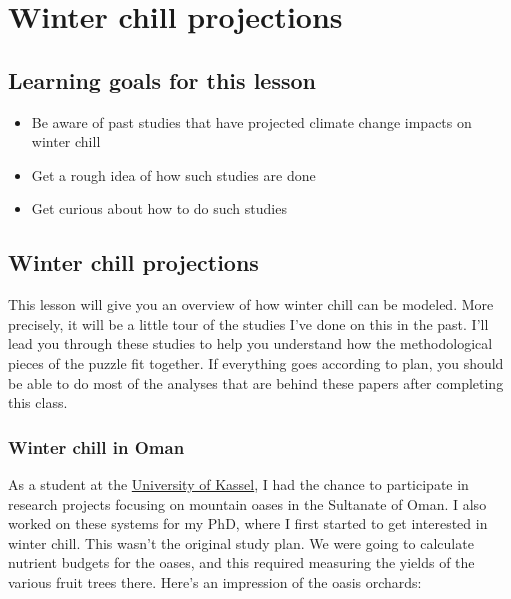 \documentclass[
]{book}
\providecommand{\tightlist}{%
  \setlength{\itemsep}{0pt}\setlength{\parskip}{0pt}}
\begin{document}
\hypertarget{winter-chill-projections}{%
\chapter{Winter chill projections}\label{winter-chill-projections}}

\hypertarget{goals_analysis_examples}{%
\section*{Learning goals for this lesson}\label{goals_analysis_examples}}

\begin{itemize}
\tightlist
\item
  Be aware of past studies that have projected climate change impacts on winter chill
\item
  Get a rough idea of how such studies are done
\item
  Get curious about how to do such studies
\end{itemize}

\hypertarget{winter-chill-projections-1}{%
\section{Winter chill projections}\label{winter-chill-projections-1}}

This lesson will give you an overview of how winter chill can be modeled. More precisely, it will be a little tour of the studies I've done on this in the past. I'll lead you through these studies to help you understand how the methodological pieces of the puzzle fit together. If everything goes according to plan, you should be able to do most of the analyses that are behind these papers after completing this class.

\hypertarget{winter-chill-in-oman}{%
\subsection{Winter chill in Oman}\label{winter-chill-in-oman}}

As a student at the \href{https://www.uni-kassel.de/fb11agrar/fachgebiete-einrichtungen/opats/startseite.html}{University of Kassel}, I had the chance to participate in research projects focusing on mountain oases in the Sultanate of Oman. I also worked on these systems for my PhD, where I first started to get interested in winter chill. This wasn't the original study plan. We were going to calculate nutrient budgets for the oases, and this required measuring the yields of the various fruit trees there. Here's an impression of the oasis orchards:
\end{document}
